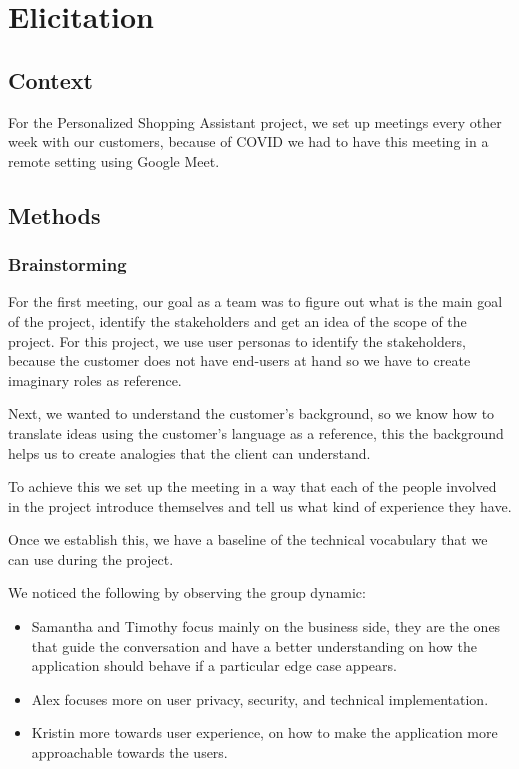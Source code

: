 \section{Elicitation}
\subsection{Context}
For the Personalized Shopping Assistant project, we set up meetings every other 
week with our customers, because of COVID we had to have this meeting in a 
remote setting using Google Meet.

\subsection{Methods}
\subsubsection{Brainstorming}
For the first meeting, our goal as a team was to figure out what is the main 
goal of the project, identify the stakeholders and get an idea of the scope of 
the project. For this project, we use user personas \cite{user_personas} to 
identify the stakeholders, because the customer does not have end-users at 
hand so we have to create imaginary roles as reference. \newline

\noindent Next, we wanted to understand the customer's background, so we know 
how to translate ideas using the customer's language as a reference, this 
the background helps us to create analogies that the client can 
understand. \newline

\noindent To achieve this we set up the meeting in a way that each of the 
people involved in the project introduce themselves and tell us what kind of 
experience they have. \newline

\noindent Once we establish this, we have a baseline of the technical 
vocabulary that we can use during the project. \newline

\noindent We noticed the following by observing the group dynamic:
\begin{itemize}
    \item Samantha and Timothy focus mainly on the business side, they are 
    the ones that guide the conversation and have a better understanding 
    on how the application should behave if a particular edge case appears.
    \item Alex focuses more on user privacy, security, and technical 
    implementation.
    \item Kristin more towards user experience, on how to make the application 
    more approachable towards the users.
\end{itemize}

